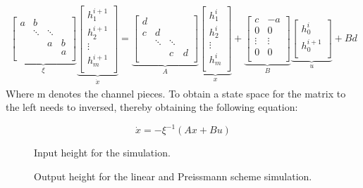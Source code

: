 \begin{equation}
\begin{aligned}
	   \underbrace{\begin{bmatrix}
	    	a & b       &           &   \\
	    	  & \ddots  & \ddots    &   \\
	    	  &  		& a  		&b  \\
	          &  		&  			&  a\\
	   \end{bmatrix}}_{\xi}
	    \underbrace{\begin{bmatrix}
		h_{1}^{i+1} \\
		h_{2}^{i+1}\\
		\vdots		\\
		h_{m}^{i+1}\\
	\end{bmatrix}}_{\dot{x}}
	= 
	\underbrace{\begin{bmatrix}
	    	d &  \\
	    	c & d & \\
	    	  &	\ddots  & \ddots   \\
	    	  &   &  c &  d\\
	    \end{bmatrix}}_{A}
	    	\underbrace{\begin{bmatrix}
		h_{1}^{i} \\
		h_{2}^{i}\\
		\vdots		\\
		h_{m}^{i}\\
		\end{bmatrix}}_{x}
	+ \underbrace{\begin{bmatrix}
		c & -a\\
		0 & 0 \\
		\vdots  & \vdots \\
		0 & 0\\
		\end{bmatrix}}_{B}
		\underbrace{\begin{bmatrix}
		h_{0}^{i} \\
		h_{0}^{i+1} \\
		\end{bmatrix}}_{u}
		+ Bd
	\end{aligned}
\end{equation}
Where m denotes the channel pieces.  
To obtain a state space for the matrix to the left needs to inversed, thereby obtaining the following equation:

\begin{equation}
	\dot{x} = -\xi^{-1} (Ax+Bu)
\end{equation}



\begin{figure}[H]
 \centering
 
\caption{Input height for the simulation.}
\label{fig:height_input_for_comparision}
\end{figure}

\begin{figure}[H]
 \centering
 
\caption{Output height for the linear and Preissmann scheme simulation.}
\label{fig:height_output_nonlinear_and_linear_model}
\end{figure}
